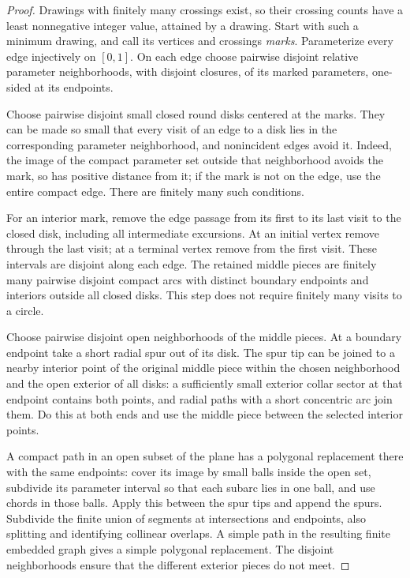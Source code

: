 \documentclass[11pt,a4paper]{article}
\theoremstyle{remark}
\numberwithin{equation}{section}
\begin{document}
\begin{proof}
Drawings with finitely many crossings exist, so their crossing
counts have a least nonnegative integer value, attained by a
drawing. Start with such a minimum drawing, and call its vertices
and crossings \emph{marks}. Parameterize every edge injectively
on \([0,1]\). On each edge choose pairwise disjoint relative
parameter neighborhoods, with disjoint closures, of its marked
parameters, one-sided at its endpoints.

Choose pairwise disjoint small closed round disks centered at the
marks. They can be made so small that every visit of an edge to
a disk lies in the corresponding parameter neighborhood, and
nonincident edges avoid it. Indeed, the image of the compact
parameter set outside that neighborhood avoids the mark, so has
positive distance from it; if the mark is not on the edge, use
the entire compact edge. There are finitely many such conditions.

For an interior mark, remove the edge passage from its first to
its last visit to the closed disk, including all intermediate
excursions. At an initial vertex remove through the last visit;
at a terminal vertex remove from the first visit. These intervals
are disjoint along each edge. The retained middle pieces are
finitely many pairwise disjoint compact arcs with distinct
boundary endpoints and interiors outside all closed disks.
This step does not require finitely many visits to a circle.

Choose pairwise disjoint open neighborhoods of the middle pieces.
At a boundary endpoint take a short radial spur out of its disk.
The spur tip can be joined to a nearby interior point of the
original middle piece within the chosen neighborhood and the open
exterior of all disks: a sufficiently small exterior collar sector
at that endpoint contains both points, and radial paths with a
short concentric arc join them. Do this at both ends and use the
middle piece between the selected interior points.

A compact path in an open subset of the plane has a polygonal
replacement there with the same endpoints: cover its image by
small balls inside the open set, subdivide its parameter interval
so that each subarc lies in one ball, and use chords in those balls.
Apply this between the spur tips and append the spurs.
Subdivide the finite union of segments at intersections and
endpoints, also splitting and identifying collinear overlaps.
A simple path in the resulting finite embedded graph gives a
simple polygonal replacement. The disjoint neighborhoods ensure
that the different exterior pieces do not meet.


\end{proof}
\end{document}
